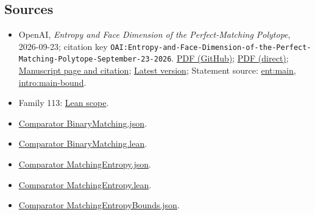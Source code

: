 \documentclass[11pt]{article}
\begin{document}
\subsection{Sources}
\begin{itemize}
\item OpenAI, \emph{Entropy and Face Dimension of the Perfect-Matching Polytope}, 2026-09-23; citation key \texttt{OAI:Entropy-and-Face-Dimension-of-the-Perfect-Matching-Polytope-September-23-2026}. \href{https://github.com/openai/math/blob/adc7f1241b42e322a6451854ab7e4b4c146bf78a/preprints/Entropy-and-Face-Dimension-of-the-Perfect-Matching-Polytope-September-23-2026/main.pdf}{PDF (GitHub)}; \href{https://github.com/openai/math/raw/adc7f1241b42e322a6451854ab7e4b4c146bf78a/preprints/Entropy-and-Face-Dimension-of-the-Perfect-Matching-Polytope-September-23-2026/main.pdf}{PDF (direct)}; \href{https://github.com/openai/math/blob/adc7f1241b42e322a6451854ab7e4b4c146bf78a/preprints/Entropy-and-Face-Dimension-of-the-Perfect-Matching-Polytope-September-23-2026/README.md}{Manuscript page and citation}; \href{https://github.com/openai/math/blob/main/preprints/Entropy-and-Face-Dimension-of-the-Perfect-Matching-Polytope-September-23-2026/main.pdf}{Latest version}; Statement source: \href{https://github.com/openai/math/blob/adc7f1241b42e322a6451854ab7e4b4c146bf78a/preprints/Entropy-and-Face-Dimension-of-the-Perfect-Matching-Polytope-September-23-2026/build/sections/01-introduction.tex\#L33}{ent:main, intro:main-bound}.
\item Family 113: \href{https://github.com/openai/math/blob/adc7f1241b42e322a6451854ab7e4b4c146bf78a/lean/docs/113.md}{Lean scope}.
\item \href{https://github.com/openai/math/blob/adc7f1241b42e322a6451854ab7e4b4c146bf78a/lean/ComparatorChallenges/BinaryMatching.json}{Comparator BinaryMatching.json}.
\item \href{https://github.com/openai/math/blob/adc7f1241b42e322a6451854ab7e4b4c146bf78a/lean/ComparatorChallenges/BinaryMatching.lean}{Comparator BinaryMatching.lean}.
\item \href{https://github.com/openai/math/blob/adc7f1241b42e322a6451854ab7e4b4c146bf78a/lean/ComparatorChallenges/MatchingEntropy.json}{Comparator MatchingEntropy.json}.
\item \href{https://github.com/openai/math/blob/adc7f1241b42e322a6451854ab7e4b4c146bf78a/lean/ComparatorChallenges/MatchingEntropy.lean}{Comparator MatchingEntropy.lean}.
\item \href{https://github.com/openai/math/blob/adc7f1241b42e322a6451854ab7e4b4c146bf78a/lean/ComparatorChallenges/MatchingEntropyBounds.json}{Comparator MatchingEntropyBounds.json}.

\end{itemize}
\end{document}
